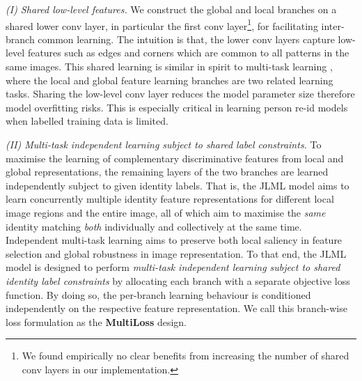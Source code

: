 \documentclass{article}
\begin{document}
\vspace{0.1cm}
\noindent \textit{(I) Shared low-level features.}
We construct the global and local branches on a shared lower conv
layer, in particular the first conv layer\footnote{We found
empirically no clear benefits from increasing the number of shared
conv layers in our implementation.}, for facilitating inter-branch
common learning. 
The intuition is that, the lower conv layers capture low-level
features such as edges and corners which are common to all patterns in
the same images. This shared learning is similar in spirit to
multi-task learning \cite{argyriou2007multi}, where
the local and global feature learning branches are two related learning tasks.
Sharing the low-level conv layer reduces the model parameter size
therefore model overfitting risks. This is especially critical in
learning person re-id models when labelled training data is limited.


\vspace{0.1cm}
\noindent \textit{(II) Multi-task independent learning subject to
shared label constraints.}
To maximise the learning of complementary discriminative features from
local and global representations, the remaining layers of the two
branches are learned independently subject to given identity labels. That
is, the JLML model aims to learn concurrently multiple identity
feature representations for different local image regions and the
entire image, all of which aim to maximise the {\em same} identity
matching {\em both} individually
and collectively at the same time. 
Independent multi-task learning aims to preserve both local saliency
in feature selection and global robustness in image
representation. 
To that end, the JLML model is designed to perform {\em multi-task
independent learning subject to shared identity label constraints} by
allocating each branch with a separate objective loss function. 
By doing so, the per-branch learning behaviour is conditioned
independently on 
the respective feature representation. We call this branch-wise loss
formulation as the {\bf MultiLoss} design. 
\end{document}
